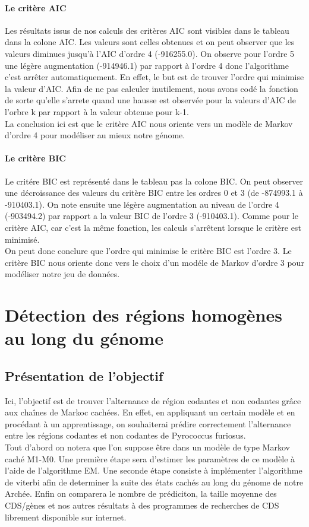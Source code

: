 \documentclass[12pt,a4paper]{article}
\begin{document}
\paragraph{Le critère AIC}
Les résultats issus de nos calculs des critères AIC sont visibles dans le tableau dans la colone AIC. Les valeurs sont celles obtenues et on peut observer que les valeurs diminues jusqu'à l'AIC d'ordre 4 (-916255.0). On observe pour l'ordre 5 une légère augmentation (-914946.1) par rapport à l'ordre 4 donc l'algorithme c'est arrêter automatiquement. En effet, le but est de trouver l'ordre qui minimise la valeur d'AIC. Afin de ne pas calculer inutilement, nous avons codé la fonction de sorte qu'elle s'arrete quand une hausse est observée pour la valeurs d'AIC de l'orbre k par rapport à la valeur obtenue pour k-1.
\\ \indent
La conclusion ici est que le critère AIC nous oriente vers un modèle de Markov d'ordre 4 pour modéliser au mieux notre génome.
\paragraph{Le critère BIC}
Le critére BIC est représenté dans le tableau pas la colone BIC. On peut observer une décroissance des valeurs du critère BIC entre les ordres 0 et 3 (de -874993.1 à -910403.1). On note ensuite une légère augmentation au niveau de l'ordre 4 (-903494.2) par rapport a la valeur BIC de l'ordre 3 (-910403.1). Comme pour le critère AIC, car c'est la même fonction, les calculs s'arrêtent lorsque le critère est minimisé.
\\ \indent
On peut donc conclure que l'ordre qui minimise le critère BIC est l'ordre 3. Le critère BIC nous oriente donc vers le choix d'un modéle de Markov d'ordre 3 pour modéliser notre jeu de données.

\section{Détection des régions homogènes au long du génome}
\subsection{Présentation de l'objectif}
Ici, l'objectif est de trouver l'alternance de région codantes et non codantes grâce aux chaînes de Markoc cachées. En effet, en appliquant un certain modèle et en procédant à un apprentissage, on souhaiterai prédire correctement l'alternance entre les régions codantes et non codantes de Pyrococcus furiosus.
\\ \indent
Tout d'abord on notera que l'on suppose être dans un modèle de type Markov caché M1-M0. Une première étape sera d'estimer les paramètres de ce modèle à l'aide de l'algorithme EM. Une seconde étape consiste à implémenter l'algorithme de viterbi afin de determiner la suite des états cachés au long du génome de notre Archée. Enfin on comparera le nombre de prédiciton, la taille moyenne des CDS/gènes et nos autres résultats à des programmes de recherches de CDS librement disponible sur internet.
\end{document}
